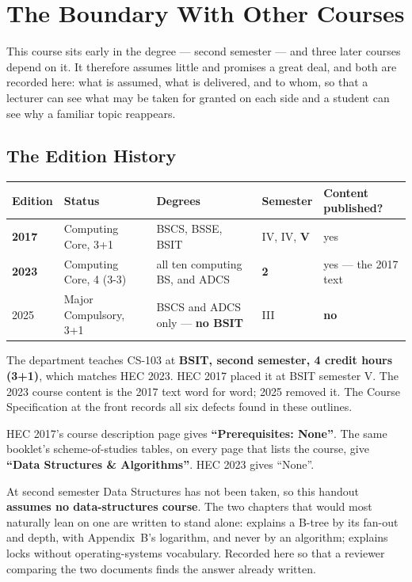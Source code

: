 \chapter{The Boundary With Other Courses}\label{app:boundary}
\normalfigures

This course sits early in the degree --- second semester --- and three later
courses depend on it. It therefore assumes little and promises a great deal,
and both are recorded here: what is assumed, what is delivered, and to whom,
so that a lecturer can see what may be taken for granted on each side and a
student can see why a familiar topic reappears.

\section{The Edition History}

\begin{longtable}{@{}L{1.6cm}L{3.6cm}L{4.4cm}L{1.6cm}L{2.8cm}@{}}
\toprule
{}
\textbf{Edition} & \textbf{Status} & \textbf{Degrees} & \textbf{Semester}
& \textbf{Content published?} \\
\midrule
\endhead
\textbf{2017} & Computing Core, 3+1 & BSCS, BSSE, BSIT & IV, IV, \textbf{V}
  & yes \\
\textbf{2023} & Computing Core, 4 (3-3) & all ten computing BS, and ADCS &
  \textbf{2} & yes --- the 2017 text \\
2025 & Major Compulsory, 3+1 & BSCS and ADCS only --- \textbf{no BSIT} & III
  & \textbf{no} \\
\bottomrule
\end{longtable}

\smallskip
The department teaches CS-103 at \textbf{BSIT, second semester, 4 credit hours
(3+1)}, which matches HEC 2023. HEC 2017 placed it at BSIT semester V. The 2023
course content is the 2017 text word for word; 2025 removed it. The Course
Specification at the front records all six defects found in these outlines.

\begin{alertbox}
HEC 2017's course description page gives \textbf{``Prerequisites: None''}.
The same booklet's scheme-of-studies tables, on every page that lists the
course, give \textbf{``Data Structures \& Algorithms''}. HEC 2023 gives
``None''.

\smallskip
At second semester Data Structures has not been taken, so this handout
\textbf{assumes no data-structures course}. The two chapters that would most
naturally lean on one are written to stand alone:  explains a
B-tree by its fan-out and depth, with Appendix~B's logarithm, and never by an
algorithm;  explains locks without operating-systems
vocabulary. Recorded here so that a reviewer comparing the two documents finds
the answer already written.
\end{alertbox}

